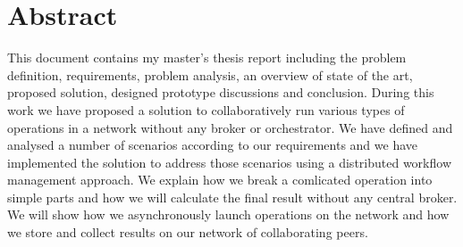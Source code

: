 \documentclass[12pt, a4paper, oneside]{report}
\begin{document}
\chapter*{Abstract}
This document contains my master's thesis report including the problem definition, requirements, problem analysis,
an overview of state of the art, proposed solution, designed prototype discussions and conclusion.
During this work we have proposed a solution to collaboratively run various types of operations in a network without any broker or orchestrator. 
We have defined and analysed a number of scenarios according to our requirements 
and we have implemented the solution to address those scenarios using a distributed workflow management approach. We explain how
we break a comlicated operation into simple parts and how we will calculate the final result without any central broker. We will show how
we asynchronously launch operations on the network and how we store and collect results on our network of collaborating peers.


\tableofcontents




\printbibliography[heading=bibintoc, title={References}]
\end{document}
